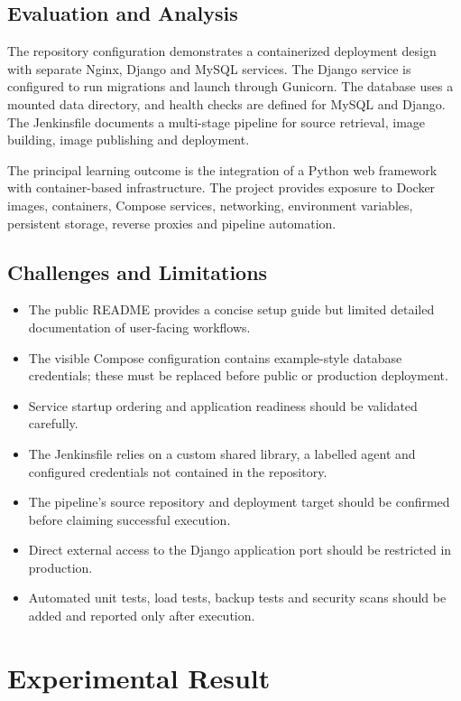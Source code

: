 \documentclass[12pt,a4paper,oneside]{report}
\begin{document}
\section{Evaluation and Analysis}
The repository configuration demonstrates a containerized deployment design with separate Nginx, Django and MySQL services. The Django service is configured to run migrations and launch through Gunicorn. The database uses a mounted data directory, and health checks are defined for MySQL and Django. The Jenkinsfile documents a multi-stage pipeline for source retrieval, image building, image publishing and deployment.

The principal learning outcome is the integration of a Python web framework with container-based infrastructure. The project provides exposure to Docker images, containers, Compose services, networking, environment variables, persistent storage, reverse proxies and pipeline automation.

\section{Challenges and Limitations}
\begin{itemize}[leftmargin=0.4in]
\item The public README provides a concise setup guide but limited detailed documentation of user-facing workflows.
\item The visible Compose configuration contains example-style database credentials; these must be replaced before public or production deployment.
\item Service startup ordering and application readiness should be validated carefully.
\item The Jenkinsfile relies on a custom shared library, a labelled agent and configured credentials not contained in the repository.
\item The pipeline's source repository and deployment target should be confirmed before claiming successful execution.
\item Direct external access to the Django application port should be restricted in production.
\item Automated unit tests, load tests, backup tests and security scans should be added and reported only after execution.
\end{itemize}

\chapter{Experimental Result}
\end{document}
